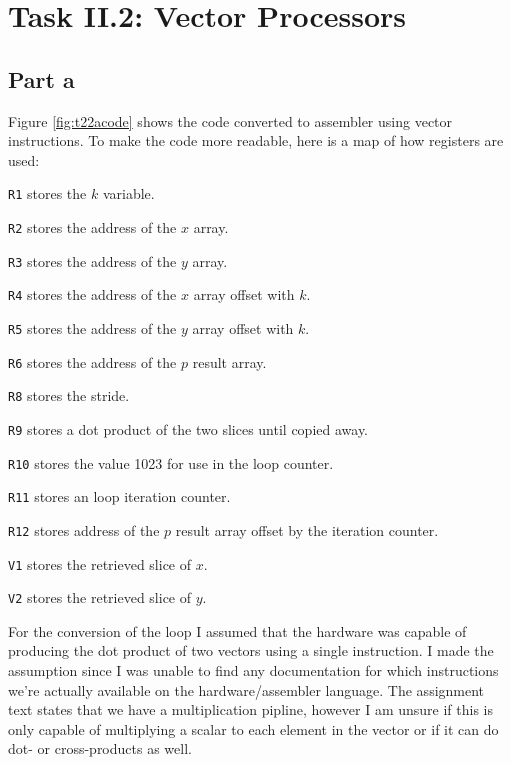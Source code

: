 \section{Task II.2: Vector Processors}

\subsection{Part a}
Figure \ref{fig:t22acode} shows the code converted to assembler using vector
instructions. To make the code more readable, here is a map of how registers are
used:
\begin{itemize*}
    \item[\texttt{R1}] stores the $k$ variable.
    \item[\texttt{R2}] stores the address of the $x$ array.
    \item[\texttt{R3}] stores the address of the $y$ array.
    \item[\texttt{R4}] stores the address of the $x$ array offset with $k$.
    \item[\texttt{R5}] stores the address of the $y$ array offset with $k$.
    \item[\texttt{R6}] stores the address of the $p$ result array.
    \item[\texttt{R8}] stores the stride.
    \item[\texttt{R9}] stores a dot product of the two slices until copied away.
    \item[\texttt{R10}] stores the value 1023 for use in the loop counter.
    \item[\texttt{R11}] stores an loop iteration counter.
    \item[\texttt{R12}] stores address of the $p$ result array offset by the iteration counter.
    \item[\texttt{V1}] stores the retrieved slice of $x$.
    \item[\texttt{V2}] stores the retrieved slice of $y$.
\end{itemize*}

For the conversion of the loop I assumed that the hardware was capable of
producing the dot product of two vectors using a single instruction. I made the
assumption since I was unable to find any documentation for which instructions
we're actually available on the hardware/assembler language. The assignment text
states that we have  a multiplication pipline, however I am unsure if this is
only capable of multiplying a scalar to each element in the vector or if it can
do dot- or cross-products as well.

